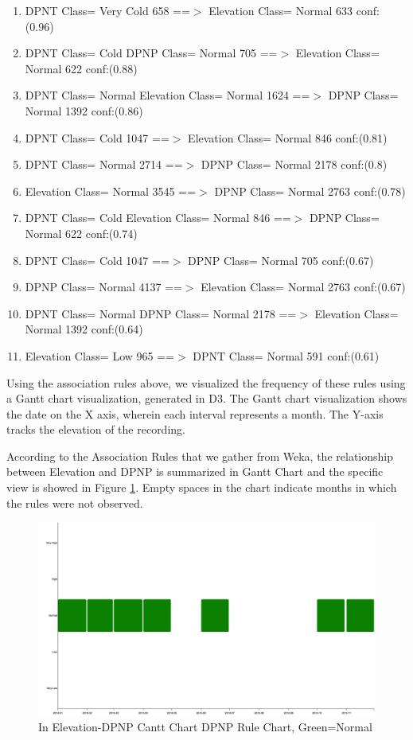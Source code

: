 \documentclass[11pt]{article}
\begin{document}
\begin{enumerate}
\item DPNT Class= Very Cold 658 ==$>$  Elevation Class= Normal 633    conf:(0.96)
\item DPNT Class= Cold  DPNP Class= Normal 705 ==$>$  Elevation Class= Normal 622    conf:(0.88)
\item DPNT Class= Normal  Elevation Class= Normal 1624 ==$>$  DPNP Class= Normal 1392    conf:(0.86)
\item DPNT Class= Cold 1047 ==$>$  Elevation Class= Normal 846    conf:(0.81)
\item DPNT Class= Normal 2714 ==$>$  DPNP Class= Normal 2178    conf:(0.8)
\item Elevation Class= Normal 3545 ==$>$  DPNP Class= Normal 2763    conf:(0.78)
\item DPNT Class= Cold  Elevation Class= Normal 846 ==$>$  DPNP Class= Normal 622    conf:(0.74)
\item DPNT Class= Cold 1047 ==$>$  DPNP Class= Normal 705    conf:(0.67)
\item DPNP Class= Normal 4137 ==$>$  Elevation Class= Normal 2763    conf:(0.67)
\item DPNT Class= Normal  DPNP Class= Normal 2178 ==$>$  Elevation Class= Normal 1392    conf:(0.64)
\item Elevation Class= Low 965 ==$>$  DPNT Class= Normal 591    conf:(0.61)
\end{enumerate}

Using the association rules above, we visualized the frequency of these rules using a Gantt chart visualization, generated in D3. The Gantt chart visualization shows the date on the X axis, wherein each interval represents a month. The Y-axis tracks the elevation of the recording.

%

According to the Association Rules that we gather from Weka, the relationship between Elevation and DPNP is summarized in Gantt Chart and the specific view is showed in Figure \ref{fig:Gantt Chart for DPNP}. Empty spaces in the chart indicate months in which the rules were not observed.

\begin{figure}
  \centering
  \includegraphics[width=\textwidth]{fig/ganttchart-dpnp.png}
  \caption{In Elevation-DPNP Cantt Chart DPNP Rule Chart, Green=Normal}
  \label{fig:Gantt Chart for DPNP}
  \vspace{-0.1 in}
\end{figure}
\end{document}
